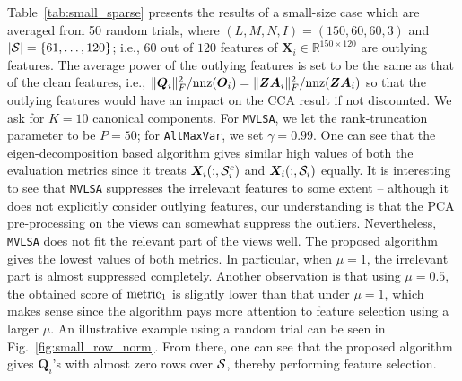 \documentclass[10pt,journal]{IEEEtran}
\newcommand{\X}{\boldsymbol{X}}
\begin{document}
Table~\ref{tab:small_sparse} presents the results of a small-size case which are averaged from 50 random trials, where $(L,M,N,I)=(150,60,60,3)$ and $|{\cal S}|=\{61,\ldots,120\}$; i.e.,
$60$ out of $120$ features of $\X_i\in\mathbb{R}^{150\times 120}$ are outlying features.
The average power of the outlying features is set to be the same as that of the clean features, i.e.,
$\|{\bm Q}_i\|_F^2/{\rm nnz}({\bm O}_i)=\|{\bm Z}{\bm A}_i\|_F^2/{\rm nnz}({\bm Z}{\bm A}_i)$ so that the outlying features would have an impact on the CCA result if not discounted.
We ask for $K=10$ canonical components. For \texttt{MVLSA}, we let the rank-truncation parameter to be $P=50$; for \texttt{AltMaxVar}, we set $\gamma=0.99$.
One can see that the eigen-decomposition based algorithm gives similar high values of both the evaluation metrics since it treats $\X_i(:,{\cal S}^c_i)$ and $\X_i(:,{\cal S}_i)$ equally.
It is interesting to see that \texttt{MVLSA} suppresses the irrelevant features to some extent -- although
it does not explicitly consider outlying features, our understanding is that the PCA pre-processing on the views can somewhat suppress the outliers.
Nevertheless, \texttt{MVLSA} does not fit the relevant part of the views well.
The proposed algorithm gives the lowest values of both metrics. In particular, when $\mu=1$, the irrelevant part is almost suppressed completely.
Another observation is that using $\mu=0.5$, the obtained score of ${\rm metric}_1$ is slightly lower than that under $\mu=1$, which makes sense since the algorithm pays more attention to feature selection using a larger $\mu$.
An illustrative example using a random trial can be seen in Fig.~\ref{fig:small_row_norm}.
From there, one can see that the proposed algorithm gives ${\bm Q}_i$'s with almost zero rows over ${\cal S}$, thereby performing feature selection.




\begin{table}[htbp]
  \centering
  \caption{Performance of the algorithms when irrelevant features are present. $(L,M,N)=(150,60,60)$; $|{\cal S}|=60$; $\X_i\in\mathbb{R}^{150\times 120}$; $\sigma=1$.}
  \label{tab:small_sparse}%
\end{table}%
\end{document}
